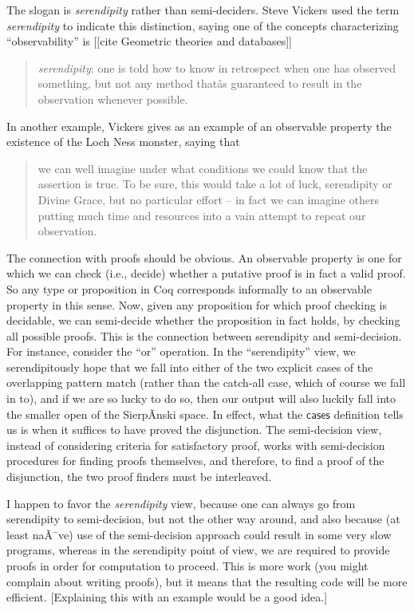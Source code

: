 The slogan is \emph{serendipity} rather than semi-deciders. Steve Vickers used the term \emph{serendipity} to indicate this distinction, saying one of the concepts characterizing ``observability'' is [[cite Geometric theories and databases]]
\begin{quote}
\emph{serendipity}: one is told how to know in retrospect when one has observed something, but not any method thatâs guaranteed to result in the observation whenever possible.
\end{quote}

In another example, Vickers gives as an example of an observable property the existence of the Loch Ness monster, saying that
\begin{quote}
we can well imagine under what conditions we could know that the assertion is true. To be sure, this would take a lot of luck, serendipity or Divine Grace, but no particular effort -- in fact we can imagine others putting much time and resources into a vain attempt to repeat our observation.
\end{quote}

The connection with proofs should be obvious. An observable property is one for which we can check (i.e., decide) whether a putative proof is in fact a valid proof. So any type or proposition in Coq corresponds informally to an observable property in this sense. Now, given any proposition for which proof checking is decidable, we can semi-decide whether the proposition in fact holds, by checking all possible proofs. This is the connection between serendipity and semi-decision. For instance, consider the ``or'' operation. In the ``serendipity'' view, we serendipitously hope that we fall into either of the two explicit cases of the overlapping pattern match (rather than the catch-all case, which of course we fall in to), and if we are so lucky to do so, then our output will also luckily fall into the smaller open of the SierpÃ­nski space. In effect, what the $\mathsf{cases}$ definition tells us is when it suffices to have proved the disjunction. The semi-decision view, instead of considering criteria for satisfactory proof, works with semi-decision procedures for finding proofs themselves, and therefore, to find a proof of the disjunction, the two proof finders must be interleaved.

I happen to favor the \emph{serendipity} view, because one can always go from serendipity to semi-decision, but not the other way around, and also because (at least naÃ¯ve) use of the semi-decision approach could result in some very slow programs, whereas in the serendipity point of view, we are required to provide proofs in order for computation to proceed. This is more work (you might complain about writing proofs), but it means that the resulting code will be more efficient. [Explaining this with an example would be a good idea.]

